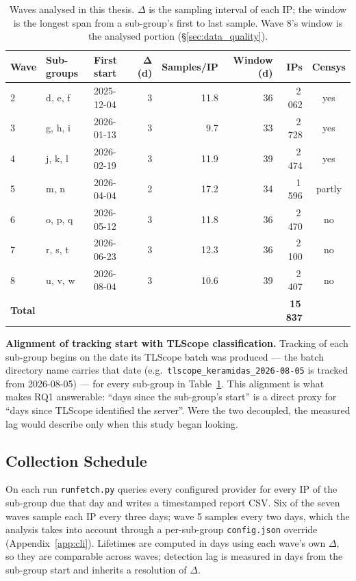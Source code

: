 \begin{table}[h]
  \centering
  \caption{Waves analysed in this thesis. $\Delta$ is the sampling interval of each IP; the window
    is the longest span from a sub-group's first to last sample. Wave 8's window is the analysed
    portion (\S\ref{sec:data_quality}).}
  \label{tab:waves}
  \small
  \setlength{\tabcolsep}{4.5pt}
  \begin{tabular}{lllrrrrc}
    \toprule
    \textbf{Wave} & \textbf{Sub-groups} & \textbf{First start} & $\boldsymbol{\Delta}$ \textbf{(d)}
      & \textbf{Samples/IP} & \textbf{Window (d)} & \textbf{IPs} & \textbf{Censys} \\
    \midrule
    2 & d, e, f & 2025-12-04 & 3 & 11.8 & 36 & 2\,062 & yes \\
    3 & g, h, i & 2026-01-13 & 3 &  9.7 & 33 & 2\,728 & yes \\
    4 & j, k, l & 2026-02-19 & 3 & 11.9 & 39 & 2\,474 & yes \\
    5 & m, n    & 2026-04-04 & 2 & 17.2 & 34 & 1\,596 & partly \\
    6 & o, p, q & 2026-05-12 & 3 & 11.8 & 36 & 2\,470 & no \\
    7 & r, s, t & 2026-06-23 & 3 & 12.3 & 36 & 2\,100 & no \\
    8 & u, v, w & 2026-08-04 & 3 & 10.6 & 39 & 2\,407 & no \\
    \midrule
    \textbf{Total} & & & & & & \textbf{15\,837} & \\
    \bottomrule
  \end{tabular}
\end{table}

\textbf{Alignment of tracking start with TLScope classification.} Tracking of each sub-group begins
on the date its TLScope batch was produced --- the batch directory name carries that date (e.g.\
\texttt{tlscope\_keramidas\_2026-08-05} is tracked from 2026-08-05) --- for every sub-group in
Table~\ref{tab:waves}. This alignment is what makes RQ1 answerable: ``days since the sub-group's
start'' is a direct proxy for ``days since TLScope identified the server''. Were the two decoupled,
the measured lag would describe only when this study began looking.

\subsection{Collection Schedule}
\label{sec:collection_schedule}

On each run \texttt{runfetch.py} queries every configured provider for every IP of the sub-group due
that day and writes a timestamped report CSV. Six of the seven waves sample each IP every three
days; wave 5 samples every two days, which the analysis takes into account through a per-sub-group
\texttt{config.json} override (Appendix~\ref{app:cli}). Lifetimes are computed in days using each
wave's own $\Delta$, so they are comparable across waves; detection lag is measured in days from the
sub-group start and inherits a resolution of $\Delta$.

